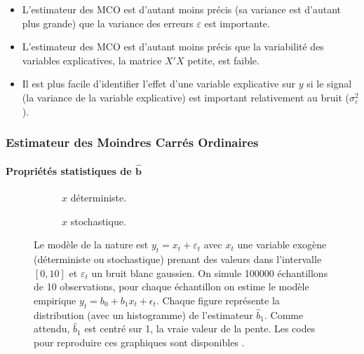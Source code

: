 \documentclass[10pt]{beamer}
\begin{document}
\begin{notes}
  \begin{itemize}
  \item L'estimateur des MCO est d'autant moins précis (sa variance est d'autant plus grande) que la variance des erreurs $\varepsilon$ est importante.\newline

  \item L'estimateur des MCO est d'autant moins précis que la variabilité des variables explicatives, la matrice $X'X$ \guillemotleft petite\guillemotright, est faible.\newline

  \item[$\Rightarrow$] Il est plus facile d'identifier l'effet d'une variable explicative sur $y$ si le signal (la variance de la variable explicative) est important relativement au bruit ($\sigma_{\varepsilon}^2$).
  \end{itemize}

\end{notes}


\begin{frame}
  \frametitle{Estimateur des Moindres Carrés Ordinaires}
  \framesubtitle {Propriétés statistiques de $\hat{\mathbf b}$}

  \begin{figure}
    \centering
    \begin{subfigure}{0.48\textwidth}
      \scalebox{.3}{
    }
    \caption{$x$ déterministe.}
    \label{fig:slope:a}
  \end{subfigure}
  \hfill
  \begin{subfigure}{0.48\textwidth}
    \scalebox{.3}{
    }
    \caption{$x$ stochastique.}
    \label{fig:slope:b}
  \end{subfigure}
  \caption{Le modèle de la nature est $y_t = x_t + \varepsilon_t$ avec $x_t$ une variable exogène (déterministe ou stochastique) prenant des valeurs dans l'intervalle $[0,10]$ et $\varepsilon_t$ un bruit blanc gaussien. On simule 100000  échantillons de 10 observations, pour chaque échantillon on estime le modèle empirique $y_t = b_0 + b_1 x_t + \epsilon_t$. Chaque figure représente la distribution (avec un histogramme) de l'estimateur $\hat b_1$. Comme attendu,  $\hat b_1$ est centré sur 1, la vraie valeur de la pente.  Les codes pour reproduire ces graphiques sont disponibles .}
  \label{fig:slope}
\end{figure}
\end{frame}
\end{document}
